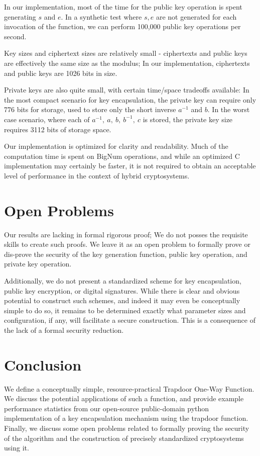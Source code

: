 \documentclass[preprint]{iacrtrans}
\begin{document}
In our implementation, most of the time for the public key operation is spent generating $s$ and $e$. In a synthetic test where $s, e$ are not generated for each invocation of the function, we can perform 100,000 public key operations per second.

Key sizes and ciphertext sizes are relatively small - ciphertexts and public keys are effectively the same size as the modulus; In our implementation, ciphertexts and public keys are 1026 bits in size.

Private keys are also quite small, with certain time/space tradeoffs available: In the most compact scenario for key encapsulation, the private key can require only 776 bits for storage, used to store only the short inverse $a^{-1}$ and $b$. In the worst case scenario, where each of $a^{-1},\ a,\ b,\ b^{-1},\ c$ is stored, the private key size requires 3112 bits of storage space. 

Our implementation is optimized for clarity and readability. Much of the computation time is spent on BigNum operations, and while an optimized C implementation may certainly be faster, it is not required to obtain an acceptable level of performance in the context of hybrid cryptosystems. 

\section{Open Problems}
Our results are lacking in formal rigorous proof; We do not posses the requisite skills to create such proofs. We leave it as an open problem to formally prove or dis-prove the security of the key generation function, public key operation, and private key operation.

Additionally, we do not present a standardized scheme for key encapsulation, public key encryption, or digital signatures. While there is clear and obvious potential to construct such schemes, and indeed it may even be conceptually simple to do so, it remains to be determined exactly what parameter sizes and configuration, if any, will facilitate a secure construction. This is a consequence of the lack of a formal security reduction.

\section{Conclusion}
We define a conceptually simple, resource-practical Trapdoor One-Way Function. We discuss the potential applications of such a function, and provide example performance statistics from our open-source public-domain python implementation of a key encapsulation mechanism using the trapdoor function. Finally, we discuss some open problems related to formally proving the security of the algorithm and the construction of precisely standardized cryptosystems using it.
\end{document}
